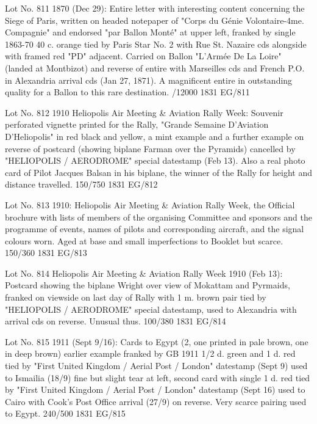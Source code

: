 \documentclass[justified]{tufte-book}
\begin{document}
%
{Lot No. 811
1870 (Dec 29): Entire letter with interesting content concerning the Siege of Paris, written on headed notepaper of "Corps du Génie Volontaire-4me. Compagnie" and endorsed "par Ballon Monté" at upper left, franked by single 1863-70 40 c. orange tied by Paris Star No. 2 with Rue St. Nazaire cds alongside with framed red "PD" adjacent. Carried on Ballon "L'Armée De La Loire"  (landed at Montbizot) and reverse of entire with Marseilles cds and French P.O. in Alexandria arrival cds (Jan 27, 1871). A magnificent entire in outstanding quality for a Ballon to this rare destination.
/12000 }%
{1831}%
{EG/811}%
{}%
{}
{}%
{}


%
{Lot No. 812
1910 Heliopolis Air Meeting \& Aviation Rally Week: Souvenir perforated vignette printed for the Rally, "Grande Semaine D'Aviation D'Heliopolis" in red black and yellow, a mint example and a further example on reverse of postcard (showing biplane Farman over the Pyramids) cancelled by "HELIOPOLIS / AERODROME" special datestamp (Feb 13). Also a real photo card of Pilot Jacques Balsan in his biplane, the winner of the Rally for height and distance travelled. 150/750}%
{1831}%
{EG/812}%
{}%
{}
{}%
{}

%
{Lot No. 813
1910: Heliopolis Air Meeting \& Aviation Rally Week, the Official brochure with lists of members of the organising Committee and sponsors and the programme of events, names of pilots and corresponding aircraft, and the signal colours worn. Aged at base and small imperfections to Booklet but scarce. 150/360}%
{1831}%
{EG/813}%
{}%
{}
{}%
{}


%
{Lot No. 814
Heliopolis Air Meeting \& Aviation Rally Week 1910 (Feb 13): Postcard showing the biplane Wright over view of Mokattam and Pyrmaids, franked on viewside on last day of Rally with 1 m. brown pair tied by "HELIOPOLIS / AERODROME" special datestamp, used to Alexandria with arrival cds on reverse. Unusual thus. 100/380}%
{1831}%
{EG/814}%
{}%
{}
{}%
{}


%
{Lot No. 815
1911 (Sept 9/16): Cards to Egypt (2, one printed in pale brown, one in deep brown) earlier example franked by GB 1911 1/2 d. green and 1 d. red tied by "First United Kingdom / Aerial Post / London" datestamp (Sept 9) used to Ismailia (18/9) fine but slight tear at left, second card with single 1 d. red tied by "First United Kingdom / Aerial Post / London" datestamp (Sept 16) used to Cairo with Cook's Post Office arrival (27/9) on reverse. Very scarce pairing used to Egypt. 240/500}%
{1831}%
{EG/815}%
{}%
{}
{}%
{}
\end{document}
